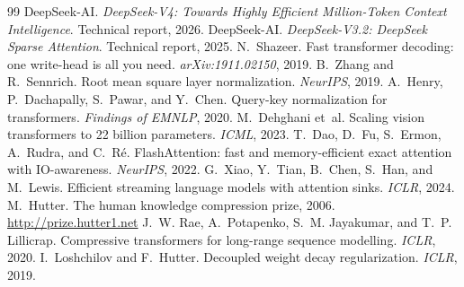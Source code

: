 \documentclass[11pt]{article}
\begin{document}
\begin{thebibliography}{99}
\small
{} DeepSeek-AI. \emph{DeepSeek-V4: Towards Highly Efficient
Million-Token Context Intelligence}. Technical report, 2026.
 DeepSeek-AI. \emph{DeepSeek-V3.2: DeepSeek Sparse
Attention}. Technical report, 2025.
 N.~Shazeer. Fast transformer decoding: one write-head
is all you need. \emph{arXiv:1911.02150}, 2019.
 B.~Zhang and R.~Sennrich. Root mean square layer
normalization. \emph{NeurIPS}, 2019.
 A.~Henry, P.~Dachapally, S.~Pawar, and Y.~Chen.
Query-key normalization for transformers. \emph{Findings of EMNLP}, 2020.
 M.~Dehghani et~al. Scaling vision transformers to
22 billion parameters. \emph{ICML}, 2023.
 T.~Dao, D.~Fu, S.~Ermon, A.~Rudra, and
C.~R\'{e}. FlashAttention: fast and memory-efficient exact attention with
IO-awareness. \emph{NeurIPS}, 2022.
 G.~Xiao, Y.~Tian, B.~Chen, S.~Han, and
M.~Lewis. Efficient streaming language models with attention sinks.
\emph{ICLR}, 2024.
 M.~Hutter. The human knowledge compression prize, 2006.
\url{http://prize.hutter1.net}
 J.~W. Rae, A.~Potapenko, S.~M. Jayakumar, and
T.~P. Lillicrap. Compressive transformers for long-range sequence modelling.
\emph{ICLR}, 2020.
 I.~Loshchilov and F.~Hutter. Decoupled weight
decay regularization. \emph{ICLR}, 2019.
\end{thebibliography}
\end{document}
